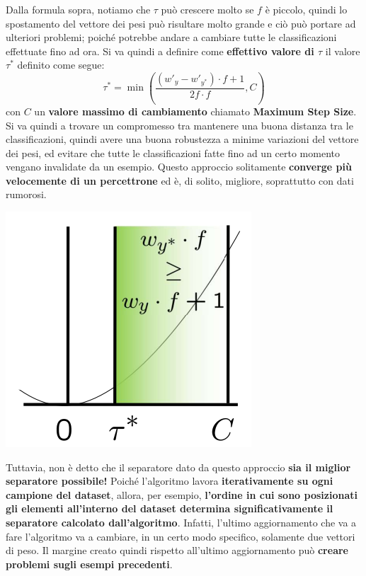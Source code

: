 \documentclass[12pt]{article}
\begin{document}
Dalla formula sopra, notiamo che $\tau$ può crescere molto se $f$ è piccolo, quindi lo spostamento del vettore dei pesi può risultare molto grande e ciò può portare
ad ulteriori problemi; poiché potrebbe andare a cambiare tutte le classificazioni effettuate fino ad ora. Si va quindi a definire come \textbf{effettivo valore di $\tau$} il valore $\tau^*$ definito come segue:
$$\tau^* = \min \left (\frac{(w'_y - w'_{y^*}) \cdot f + 1}{2f \cdot f}, C \right )$$
con $C$ un \textbf{valore massimo di cambiamento} chiamato \textbf{Maximum Step Size}.
Si va quindi a trovare un compromesso tra  mantenere una buona distanza tra le classificazioni, quindi avere una buona robustezza a minime variazioni del vettore dei pesi, ed evitare che tutte le classificazioni fatte fino ad un certo momento vengano invalidate da un esempio.
Questo approccio solitamente \textbf{converge più velocemente di un percettrone} ed è, di solito, migliore, soprattutto con dati rumorosi.
\begin{center}
    \includegraphics[width =0.35\linewidth]{Images/104.PNG}
\end{center}
Tuttavia, non è detto che il separatore dato da questo approccio \textbf{sia il miglior separatore possibile!}
Poiché l'algoritmo lavora \textbf{iterativamente su ogni campione del dataset}, allora, per esempio, \textbf{l'ordine in cui sono posizionati gli elementi all'interno del dataset determina significativamente il separatore calcolato dall'algoritmo}.
Infatti, l'ultimo aggiornamento che va a fare l'algoritmo va a cambiare, in un certo modo specifico, solamente due vettori di peso.
Il margine creato quindi rispetto all'ultimo aggiornamento può \textbf{creare problemi sugli esempi precedenti}.
\end{document}
